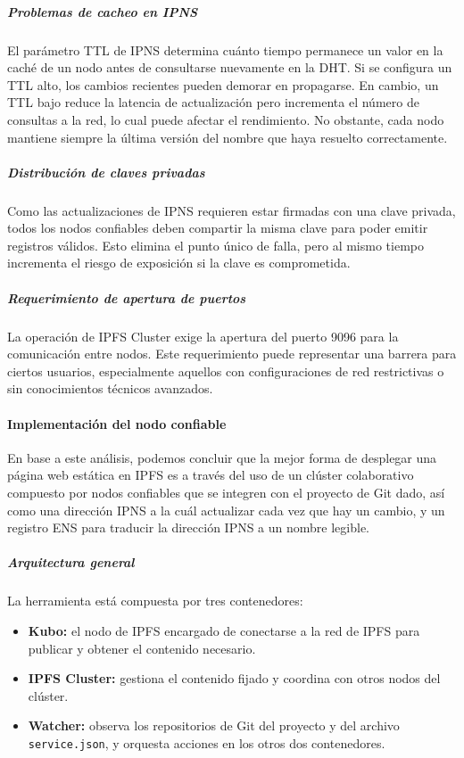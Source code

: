 \subparagraph{Problemas de cacheo en IPNS} El parámetro TTL de IPNS determina cuánto tiempo permanece un valor en la caché de un nodo antes de consultarse nuevamente en la DHT. Si se configura un TTL alto, los cambios recientes pueden demorar en propagarse. En cambio, un TTL bajo reduce la latencia de actualización pero incrementa el número de consultas a la red, lo cual puede afectar el rendimiento. No obstante, cada nodo mantiene siempre la última versión del nombre que haya resuelto correctamente.

\subparagraph{Distribución de claves privadas} Como las actualizaciones de IPNS requieren estar firmadas con una clave privada, todos los nodos confiables deben compartir la misma clave para poder emitir registros válidos. Esto elimina el punto único de falla, pero al mismo tiempo incrementa el riesgo de exposición si la clave es comprometida.

\subparagraph{Requerimiento de apertura de puertos} La operación de IPFS Cluster exige la apertura del puerto 9096 para la comunicación entre nodos. Este requerimiento puede representar una barrera para ciertos usuarios, especialmente aquellos con configuraciones de red restrictivas o sin conocimientos técnicos avanzados.

\paragraph{Implementación del nodo confiable}

En base a este análisis, podemos concluir que la mejor forma de desplegar una página web estática en IPFS es a través del uso de un clúster colaborativo compuesto por nodos confiables que se integren con el proyecto de Git dado, así como una dirección IPNS a la cuál actualizar cada vez que hay un cambio, y un registro ENS para traducir la dirección IPNS a un nombre legible.

\subparagraph{Arquitectura general}

La herramienta está compuesta por tres contenedores:
\begin{itemize}
    \item \textbf{Kubo:} el nodo de IPFS encargado de conectarse a la red de IPFS para publicar y obtener el contenido necesario.
    \item \textbf{IPFS Cluster:} gestiona el contenido fijado y coordina con otros nodos del clúster.
    \item \textbf{Watcher:} observa los repositorios de Git del proyecto y del archivo \texttt{service.json}, y orquesta acciones en los otros dos contenedores.
\end{itemize}

